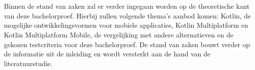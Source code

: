 \chapter{}
\label{ch:stand-van-zaken}

Binnen de stand van zaken zal er verder ingegaan worden op de theoretische kant van deze bachelorproef. Hierbij zullen volgende thema's aanbod komen: Kotlin, de mogelijke ontwikkelingsvormen voor mobiele applicaties, Kotlin Multiplatform en Kotlin Multiplatform Mobile, de vergelijking met andere alternatieven en de gekozen testcriteria voor deze bachelorproef. De stand van zaken bouwt verder op de informatie uit de inleiding en wordt versterkt aan de hand van de literatuurstudie. 


%
%
%
%


